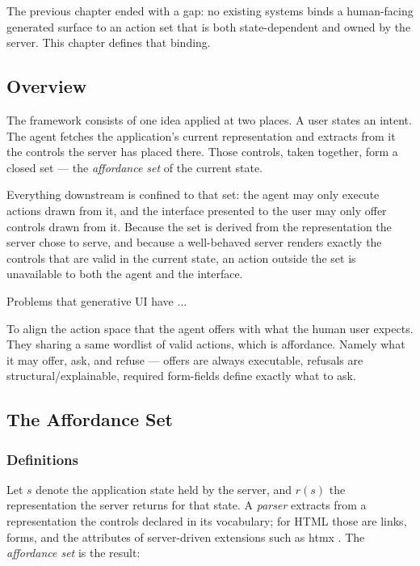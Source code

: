 The previous chapter ended with a gap: no existing systems binds a human-facing generated surface to an action set that is both state-dependent and owned by the server. This chapter defines that binding.

\subsection{Overview}\label{sec:design:overview}

The framework consists of one idea applied at two places. A user states an intent. The agent fetches the application's current representation and extracts from it the controls the server has placed there. Those controls, taken together, form a closed set --- the \emph{affordance set} of the current state. 

Everything downstream is confined to that set: the agent may only execute actions drawn from it, and the interface presented to the user may only offer controls drawn from it. Because the set is derived from the representation the server chose to serve, and because a well-behaved server renders exactly the controls that are valid in the current state, an action outside the set is unavailable to both the agent and the interface.



Problems that generative UI have ...

To align the action space that the agent offers with what the human user expects. They sharing a same wordlist of valid actions, which is affordance. Namely what it may offer, ask, and refuse — offers are always executable, refusals are structural/explainable, required form-fields define exactly what to ask.


\subsection{The Affordance Set}\label{sec:design:formal}


\subsubsection{Definitions}\label{sec:design:defs}

Let $s$ denote the application state held by the server, and $r(s)$ the representation the server returns for that state. A \emph{parser} extracts from a representation the controls declared in its vocabulary; for HTML those are links, forms, and the attributes of server-driven extensions such as htmx \cite{htmxlDocs}. The \emph{affordance set} is the result:

